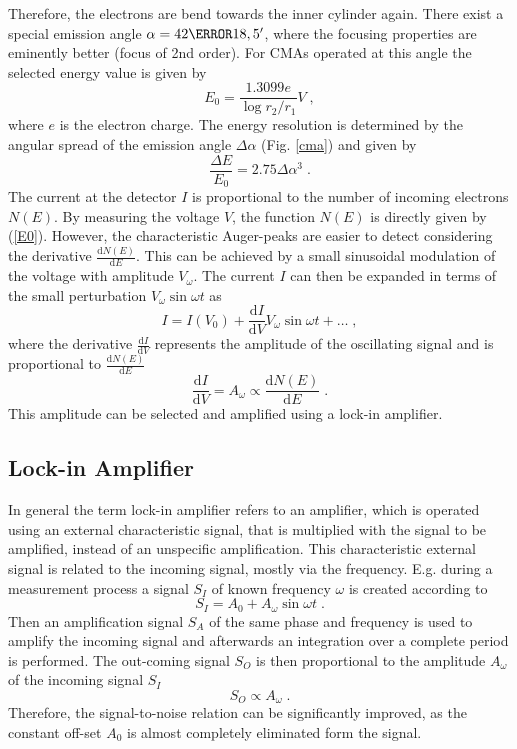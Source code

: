 \documentclass[a4paper]{scrartcl}
\numberwithin{equation}{section}
\numberwithin{figure}{section}
\numberwithin{table}{section}
\newcommand{\eq}[2]{\begin{equation}#1\label{#2}\end{equation}}
\newcommand{\Formel}[1]{(\ref{#1})}
\renewcommand{\d}{\mathrm{d}}
\begin{document}
Therefore, the electrons are bend towards the inner cylinder again. There exist a special emission angle $\alpha=42\degree 18,5 '$, where the focusing properties are eminently better (focus of 2nd order). For CMAs operated at this angle the selected energy value is given by
\eq{E_0 = \frac{1.3099 e}{\log{r_2/r_1}} V \; ,}{E0}
where $e$ is the electron charge. The energy resolution is determined by the angular spread of the emission angle $\Delta \alpha$ (Fig. \ref{cma}) and given by
\eq{\frac{\Delta E}{E_0} = 2.75 \Delta \alpha^3 \; .}{dE} 
The current at the detector $I$ is proportional to the number of incoming  electrons $N(E)$. By measuring the voltage $V$, the function $N(E)$ is directly given by \Formel{E0}. However, the characteristic Auger-peaks are easier to detect considering the derivative $\frac{\d N(E)}{\d E}$. This can be achieved by a small sinusoidal modulation of the voltage with amplitude $V_\omega$. %
The current $I$ can then be expanded in terms of the small perturbation $V_\omega \sin \omega t$ as
\eq{ I = I(V_0) + \frac{\d I}{\d V} V_\omega \sin \omega t + \ldots \; ,}{}
where the derivative $\frac{\d I}{\d V}$ represents the amplitude of the oscillating signal and is proportional to $\frac{\d N(E)}{\d E}$
\eq{\frac{\d I}{\d V} = A_\omega \propto \frac{\d N(E)}{\d E} \; . }{}
This amplitude can be selected and amplified using a lock-in amplifier. 

\subsection{Lock-in Amplifier}
In general the term lock-in amplifier refers to an amplifier, which is operated using an external characteristic signal, that is multiplied with the signal to be amplified, instead of an unspecific amplification. This characteristic external signal is related to the incoming signal, mostly via the frequency. E.g. during a measurement process a signal $S_I$ of known frequency $\omega$ is created according to
\eq{S_I = A_0 + A_\omega \sin \omega t \; . }{SI}
Then an amplification signal $S_A$ of the same phase and frequency is used to amplify the incoming signal and afterwards an integration over a complete period is performed. The out-coming signal $S_O$
is then proportional to the amplitude $A_\omega$ of the incoming signal $S_I$
\eq{S_O \propto A_\omega \; .}{}
Therefore, the signal-to-noise relation can be significantly improved, as the constant off-set $A_0$ is almost completely eliminated form the signal.
\end{document}
